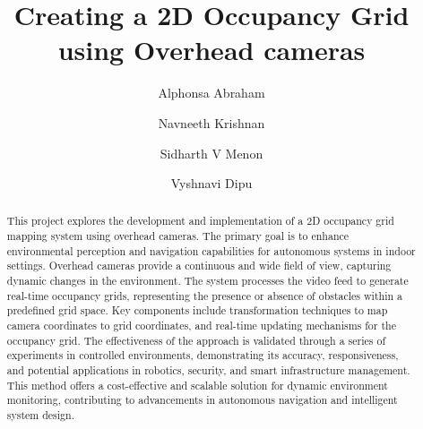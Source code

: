 \documentclass{josis}
\begin{document}


\title{Creating a 2D Occupancy Grid using Overhead cameras }

\author{Alphonsa Abraham}
\author{Navneeth Krishnan}
\author{Sidharth V Menon}
\author{Vyshnavi Dipu}
\date{}
\maketitle
\begin{abstract}
This project explores the development and implementation of a 2D occupancy grid mapping system using overhead cameras. The primary goal is to enhance environmental perception and navigation capabilities for autonomous systems in indoor settings. Overhead cameras provide a continuous and wide field of view, capturing dynamic changes in the environment. The system processes the video feed to generate real-time occupancy grids, representing the presence or absence of obstacles within a predefined grid space. Key components include transformation techniques to map camera coordinates to grid coordinates, and real-time updating mechanisms for the occupancy grid. The effectiveness of the approach is validated through a series of experiments in controlled environments, demonstrating its accuracy, responsiveness, and potential applications in robotics, security, and smart infrastructure management. This method offers a cost-effective and scalable solution for dynamic environment monitoring, contributing to advancements in autonomous navigation and intelligent system design.
\end{abstract}
\end{document}
